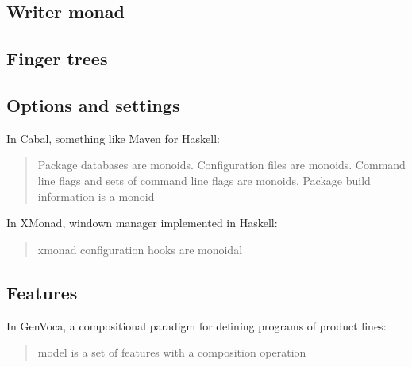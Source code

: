 \documentclass{article}
\begin{document}
    \subsection{Writer monad}

    \subsection{Finger trees}

    \subsection{Options and settings}

    In Cabal, something like Maven for Haskell: 

    \blockquote{Package databases are monoids. Configuration files are monoids. Command line flags and sets of command line flags are monoids. Package build information is a monoid}

    In XMonad, windown manager implemented in Haskell:

    \blockquote{xmonad configuration hooks are monoidal}

    \subsection{Features}

    In GenVoca, a compositional paradigm for defining programs of product lines:

    \blockquote{model is a set of features with a composition operation}
\end{document}
